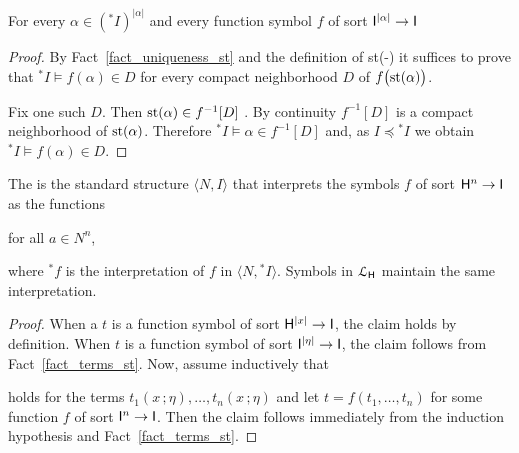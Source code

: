 \documentclass[10pt,oneside]{amsproc}
\renewcommand*{\emph}[1]{%
   \smash{\tikz[baseline]\node[rectangle, fill=teal!25, rounded corners, inner xsep=0.5ex, inner ysep=0.2ex, anchor=base, minimum height = 2.7ex]{\strut #1};}}
\begin{document}
\begin{fact}\label{fact_terms_st}
  For every $\alpha\in({}^*\!\!I)^{|\alpha|}$ and every function symbol $f$ of sort ${\sf I}^{|\alpha|}\to{\sf I}$

\end{fact}

\begin{proof}
  By Fact~\ref{fact_uniqueness_st} and the definition of st(-) it suffices to prove that ${}^*\!\!I\models f(\alpha)\in D$ for every compact neighborhood $D$ of $f\big({\rm st}(\alpha)\big)$.
  
  Fix one such $D$.
  Then ${\rm st}(\alpha)\in f^{-1}[D]$ .
  By continuity $f^{-1}[D]$ is a compact neighborhood of ${\rm st}(\alpha)$.
  Therefore ${}^*\!\!I\models \alpha\in f^{-1}[D]$ and, as $I\preceq{}^*\!\!I$ we obtain ${}^*\!\!I\models f(\alpha)\in D$.
\end{proof}

The \emph{standard part of $\langle N,{}^*\!\!I\rangle$\/} is the standard structure $\langle N,I\rangle$ that interprets the symbols $f$ of sort ${\sf H}^n\to {\sf I}$ as the functions

\hfill for all $a\in N^n$,

where ${}^*\!\!f$ is the interpretation of $f$ in  $\langle N,{}^*\!\!I\rangle$.
Symbols in ${\EuScript L}_{\sf H}$ maintain the same interpretation.

\begin{proof}
  When a $t$ is a function symbol of sort  ${\sf H}^{|x|}\to {\sf I}$, the claim holds by definition.
  When $t$ is a function symbol of sort ${\sf I}^{|\eta|}\to {\sf I}$, the claim follows from Fact~\ref{fact_terms_st}.
  Now, assume inductively that 


  holds for the terms $t_1(x\,;\eta),\dots,t_n(x\,;\eta)$ and let $t=f(t_1,\dots,t_n)$ for some function $f$ of sort ${\sf I}^n\to {\sf I}$.
  Then the claim follows immediately from the induction hypothesis and Fact~\ref{fact_terms_st}.
\end{proof}
\end{document}
